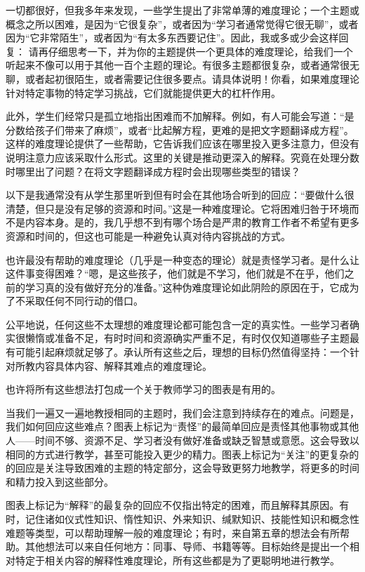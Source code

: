 一切都很好，但我多年来发现，一些学生提出了非常单薄的难度理论；一个主题或概念之所以困难，是因为“它很复杂”，或者因为“学习者通常觉得它很无聊”，或者因为“它非常陌生”，或者因为“有太多东西要记住”。因此，我或多或少会这样回复：
请再仔细思考一下，并为你的主题提供一个更具体的难度理论，给我们一个听起来不像可以用于其他一百个主题的理论。有很多主题都很复杂，或者通常很无聊，或者起初很陌生，或者需要记住很多要点。请具体说明！你看，如果难度理论针对特定事物的特定学习挑战，它们就能提供更大的杠杆作用。

此外，学生们经常只是孤立地指出困难而不加解释。例如，有人可能会写道：“是分数给孩子们带来了麻烦”，或者“比起解方程，更难的是把文字题翻译成方程”。这样的难度理论提供了一些帮助，它告诉我们应该在哪里投入更多注意力，但没有说明注意力应该采取什么形式。这里的关键是推动更深入的解释。究竟在处理分数时哪里出了问题？在将文字题翻译成方程时会出现哪些类型的错误？

以下是我通常没有从学生那里听到但有时会在其他场合听到的回应：“要做什么很清楚，但只是没有足够的资源和时间。”这是一种难度理论。它将困难归咎于环境而不是内容本身。是的，我几乎想不到有哪个场合是严肃的教育工作者不希望有更多资源和时间的，但这也可能是一种避免认真对待内容挑战的方式。

也许最没有帮助的难度理论（几乎是一种变态的理论）就是责怪学习者。是什么让这件事变得困难？“嗯，是这些孩子，他们就是不学习，他们就是不在乎，他们之前的学习真的没有做好充分的准备。”这种伪难度理论如此阴险的原因在于，它成为了不采取任何不同行动的借口。

公平地说，任何这些不太理想的难度理论都可能包含一定的真实性。一些学习者确实很懒惰或准备不足，有时时间和资源确实严重不足，有时仅仅知道哪些子主题最有可能引起麻烦就足够了。承认所有这些之后，理想的目标仍然值得坚持：一个针对所教内容具体内容、解释其难点的难度理论。

也许将所有这些想法打包成一个关于教师学习的图表是有用的。
 
当我们一遍又一遍地教授相同的主题时，我们会注意到持续存在的难点。问题是，我们如何回应这些难点？图表上标记为“责怪”的最简单回应是责怪其他事物或其他人——时间不够、资源不足、学习者没有做好准备或缺乏智慧或意愿。这会导致以相同的方式进行教学，甚至可能投入更少的精力。图表上标记为“关注”的更复杂的的回应是关注导致困难的主题的特定部分，这会导致更努力地教学，将更多的时间和精力投入到这些部分。

图表上标记为“解释”的最复杂的回应不仅指出特定的困难，而且解释其原因。有时，记住诸如仪式性知识、惰性知识、外来知识、缄默知识、技能性知识和概念性难题等类型，可以帮助理解一般的难度理论；有时，来自第五章的想法会有所帮助。其他想法可以来自任何地方：同事、导师、书籍等等。目标始终是提出一个相对特定于相关内容的解释性难度理论，所有这些都是为了更聪明地进行教学。

